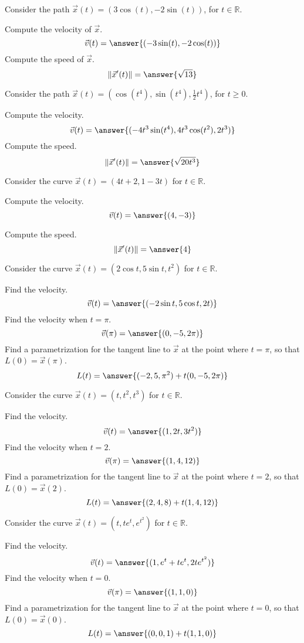 \documentclass{ximera}
\begin{document}
\begin{problem}
Consider the path $\vec{x}(t) = (3\cos(t), -2\sin(t))$, for $t\in\mathbb{R}$.

Compute the velocity of $\vec{x}$.
\[
\vec{v}(t) = \answer{(-3\sin(t), -2\cos(t))}
\]
Compute the speed of $\vec{x}$.
\[
\|\vec{x}'(t)\| = \answer{\sqrt{13}}
\]

\end{problem}

\begin{problem}
Consider the path $\vec{x}(t) = (\cos(t^4), \sin(t^4), \frac{1}{2}t^4)$, for $t \geq 0$.

Compute the velocity.
\[
\vec{v}(t) = \answer{(-4t^3\sin(t^4), 4t^3\cos(t^2), 2t^3)}
\]
Compute the speed.
\[
\|\vec{x}'(t)\| = \answer{\sqrt{20t^3}}
\]
\end{problem}

\begin{problem}
Consider the curve $\vec{x}(t) = (4t+2, 1-3t)$ for $t\in\mathbb{R}$.

Compute the velocity.
\[
\vec{v}(t) = \answer{(4,-3)}
\]

Compute the speed.
\[
\|\vec{x}'(t)\| = \answer{4}
\]

\end{problem}

\begin{problem}
Consider the curve $\vec{x}(t) = (2\cos t, 5\sin t, t^2)$ for $t\in\mathbb{R}$.

Find the velocity.
\[
\vec{v}(t) = \answer{(-2\sin t, 5\cos t, 2t)}
\]
Find the velocity when $t = \pi$.
\[
\vec{v}(\pi) = \answer{(0,-5,2\pi)}
\]
Find a parametrization for the tangent line to $\vec{x}$ at the point where $t = \pi$, so that $L(0) = \vec{x}(\pi)$.
\[
L(t) = \answer{(-2,5,\pi^2) + t(0,-5,2\pi)}
\]
\end{problem}

\begin{problem}
Consider the curve $\vec{x}(t) = (t, t^2, t^3)$ for $t\in\mathbb{R}$.

Find the velocity.
\[
\vec{v}(t) = \answer{(1, 2t, 3t^2)}
\]
Find the velocity when $t = 2$.
\[
\vec{v}(\pi) = \answer{(1,4,12)}
\]
Find a parametrization for the tangent line to $\vec{x}$ at the point where $t = 2$, so that $L(0) = \vec{x}(2)$.
\[
L(t) = \answer{(2,4,8) + t(1,4,12)}
\]
\end{problem}

\begin{problem}
Consider the curve $\vec{x}(t) = (t, te^t, e^{t^2})$ for $t\in\mathbb{R}$.

Find the velocity.
\[
\vec{v}(t) = \answer{(1, e^t+te^t, 2te^{t^2})}
\]
Find the velocity when $t = 0$.
\[
\vec{v}(\pi) = \answer{(1,1,0)}
\]
Find a parametrization for the tangent line to $\vec{x}$ at the point where $t = 0$, so that $L(0) = \vec{x}(0)$.
\[
L(t) = \answer{(0,0,1) + t(1,1,0)}
\]
\end{problem}
\end{document}

